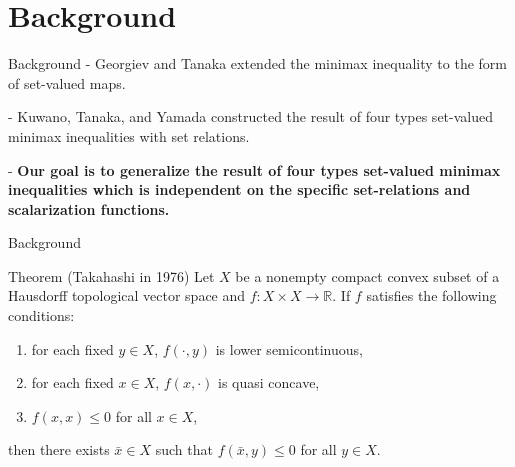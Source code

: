 \documentclass[aspectratio=169, dvipdfmx, 11pt]{beamer}
\newcommand{\RealNumberSet}{\mathbb{R}}
\begin{document}
\section{Background}

\begin{frame}{Background}
  - Georgiev and Tanaka \cite{MR1807037} extended the minimax inequality to the form of set-valued maps.

  - Kuwano, Tanaka, and Yamada \cite{MR2778674} constructed the result of four types set-valued minimax inequalities
  with set relations.

  - \textbf{Our goal is to generalize the result of four types set-valued minimax inequalities which is independent on the specific set-relations and scalarization functions.}
\end{frame}

\begin{frame}{Background}
  \begin{block}{Theorem (Takahashi \cite{MR399979} in 1976)} %
    Let $X$ be a nonempty compact convex subset of a Hausdorff topological vector space and $f \colon X \times X \to \RealNumberSet$. If $f$ satisfies
    the following conditions:
    \begin{enumerate}
      \item for each fixed $y \in X$, $f(\cdot,y)$ is lower semicontinuous,
      \item for each fixed $x \in X$, $f(x,\cdot)$ is quasi concave,
      \item $f(x,x) \leq 0$ for all $x \in X$,
    \end{enumerate}
    then there exists $\bar{x} \in X$ such that $f(\bar{x},y) \leq 0$ for all $y \in X$.
  \end{block}
\end{frame}
\end{document}
